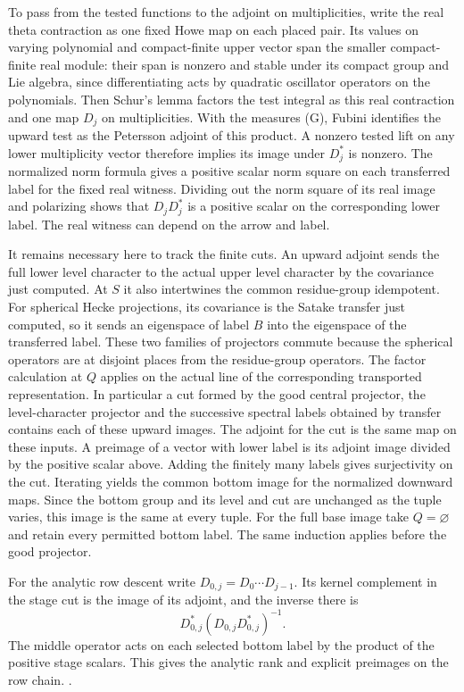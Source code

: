 To pass from the tested functions to the adjoint on
multiplicities, write the real theta contraction as
one fixed Howe map on each placed pair. Its values
on varying polynomial and compact-finite upper
vector span the smaller compact-finite real module:
their span is nonzero and stable under its compact
group and Lie algebra, since differentiating acts
by quadratic oscillator operators on the polynomials.
Then Schur's lemma factors the test integral as this
real contraction and one map \(D_j\) on multiplicities.
With the measures (G), Fubini identifies the
upward test as the Petersson adjoint of this product.
A nonzero tested lift on any lower multiplicity
vector therefore implies its image under \(D_j^*\)
is nonzero. The normalized norm formula gives a
positive scalar norm square on each transferred
label for the fixed real witness. Dividing out the
norm square of its real image and polarizing shows
that \(D_jD_j^*\) is a positive scalar on the
corresponding lower label. The real witness can
depend on the arrow and label.

It remains necessary here to track the finite cuts.
An upward adjoint sends the full lower level character
to the actual upper level character by the covariance
just computed. At \(S\) it also intertwines the
common residue-group idempotent. For spherical
Hecke projections, its covariance is the Satake
transfer just computed, so it sends an eigenspace
of label \(B\) into the eigenspace of the transferred
label. These two families of projectors commute
because the spherical operators are at disjoint
places from the residue-group operators. The
factor calculation at \(Q\) applies on the actual
line of the corresponding transported representation.
In particular a cut formed by the good central
projector, the level-character projector and the
successive spectral labels obtained by transfer
contains each of these upward images. The adjoint
for the cut is the same map on these inputs.
A preimage of a vector with lower label is its
adjoint image divided by the positive scalar above.
Adding the finitely many labels gives surjectivity
on the cut. Iterating yields the common bottom
image for the normalized downward maps. Since
the bottom group and its level and cut are unchanged
as the tuple varies, this image is the same at
every tuple. For the full base image take
\(Q=\varnothing\) and retain every permitted
bottom label. The same induction applies before
the good projector.

For the analytic row descent write \(D_{0,j}=D_0\cdots D_{j-1}\).
Its kernel complement in the stage cut is the image of its adjoint,
and the inverse there is
\[
 D_{0,j}^*(D_{0,j}D_{0,j}^*)^{-1}.
\]
The middle operator acts on each selected bottom label by the
product of the positive stage scalars. This gives the analytic rank
and explicit preimages on the row chain.
.

